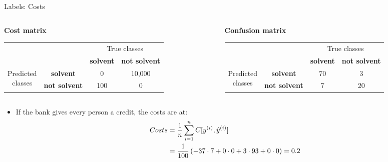 \documentclass[11pt,compress,t,notes=noshow, xcolor=table]{beamer}
\begin{document}
\begin{vbframe}{Labels: Costs}

\begin{columns}
\begin{column}{0.5\textwidth} 
\footnotesize\textbf{Cost matrix}
 \begin{table}[ht]
 \tiny
\begin{center}
\begin{tabular}{cccc}
    \hline
    & &\multicolumn{2}{c}{True classes} \\ 
    & &\textbf{solvent} & \textbf{not solvent}  \\ 
 \hline
    \multirow{2}{*}{\parbox{0.5cm}{Predicted \\ classes}}& \textbf{solvent}     & 0                 & 10,000\\
    & \textbf{not solvent} & 100               & 0\\
    \hline
\end{tabular}
\end{center}
\end{table}
\end{column}

\begin{column}{0.5\textwidth}
\footnotesize\textbf{Confusion matrix}
 \begin{table}[ht]
 \tiny
\begin{center}
\begin{tabular}{cccc}
    \hline
    & &\multicolumn{2}{c}{True classes} \\ 
    & &\textbf{solvent} & \textbf{not solvent}  \\ 
 \hline
    \multirow{2}{*}{\parbox{0.5cm}{Predicted \\ classes}}& \textbf{solvent}     & 70                 & 3\\
    & \textbf{not solvent} & 7              & 20\\
    \hline
\end{tabular}
\end{center}
\end{table}
\end{column}
\end{columns}


  \begin{itemize}
    \item If the bank gives every person a credit, the costs are at:
      \begin{align*}
      Costs &= \frac{1}{n} \sum\limits_{i=1}^n C[y^{(i)}, \hat{y}^{(i)}] \\&= 
      \frac{1}{100} \left( 
      -37 \cdot 7 + 
      0 \cdot 0 + 
      3 \cdot 93 +
      0 \cdot 0 
      \right) = 0.2
    \end{align*}
    
  
  \end{itemize}
 
 
\end{vbframe}
\end{document}
